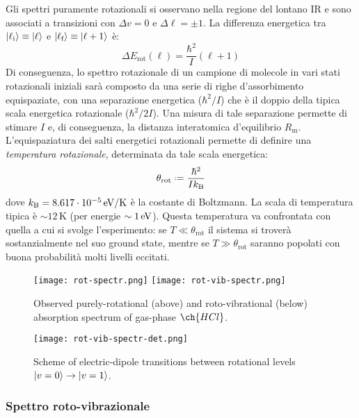 Gli spettri puramente rotazionali si osservano nella regione del lontano IR e sono associati a transizioni con $ \Delta v = 0 $ e $ \Delta \ell = \pm 1 $. La differenza energetica tra $ \ket{\ell_\text{i}} \equiv \ket{\ell} $ e $ \ket{\ell_\text{f}} \equiv \ket{\ell + 1} $ è:
\begin{equation}
	\Delta E_\text{rot}(\ell) = \frac{\hbar^2}{I} (\ell + 1)
\end{equation}
Di conseguenza, lo spettro rotazionale di un campione di molecole in vari stati rotazionali iniziali sarà composto da una serie di righe d'assorbimento equispaziate, con una separazione energetica ($ \hbar^2 / I $) che è il doppio della tipica scala energetica rotazionale ($ \hbar^2 / 2I $). Una misura di tale separazione permette di stimare $ I $ e, di conseguenza, la distanza interatomica d'equilibrio $ R_\text{m} $. \\
L'equispaziatura dei salti energetici rotazionali permette di definire una \textit{temperatura rotazionale}, determinata da tale scala energetica:
\begin{equation}
	\theta_\text{rot} \defeq \frac{\hbar^2}{I k_\text{B}}
\end{equation}
dove $ k_\text{B} = 8.617 \cdot 10^{-5} \,\mathrm{eV}/\text{K} $ è la costante di Boltzmann. La scala di temperatura tipica è $ \sim 12 \,\text{K} $ (per energie $ \sim 1\,\mathrm{eV} $). Questa temperatura va confrontata con quella a cui si svolge l'esperimento: se $ T \ll \theta_\text{rot} $ il sistema si troverà sostanzialmente nel suo ground state, mentre se $ T \gg \theta_\text{rot} $ saranno popolati con buona probabilità molti livelli eccitati.

\begin{figure}
	\centering
	\texttt{[image: rot-spectr.png]}
	\texttt{[image: rot-vib-spectr.png]}
	\caption{Observed purely-rotational (above) and roto-vibrational (below) absorption spectrum of gas-phase $ \ch{HCl} $.}
	\label{rot-vib-sp}
\end{figure}
\begin{figure}
	\centering
	\texttt{[image: rot-vib-spectr-det.png]}
	\caption{Scheme of electric-dipole transitions between rotational levels $ \ket{v = 0} \rightarrow \ket{v = 1} $.}
	\label{rot-vib-det}
\end{figure}

\subsubsection{Spettro roto-vibrazionale}

